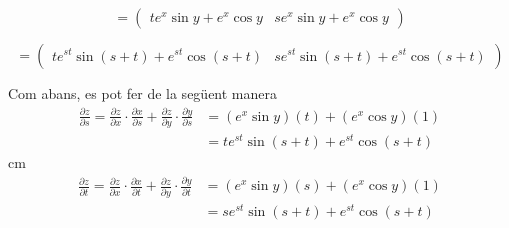 \documentclass[12pt]{article}
\begin{document}
\begin{equation*}
   =\left(\begin{array} {cc}
 t e^x \sin y + e^x
\cos y  & se^x \sin y +  e^x\cos y
\end{array} \right)
\end{equation*}

\begin{equation*}
   =\left(\begin{array} {cc}
 t e^{s t}\sin (s+ t) +  e^{s t} \cos (s+ t)  &
  s e^{s t}\sin (s+t) +  e^{s t} \cos (s+t)
\end{array} \right)
\end{equation*}

\vspace{0.4cm}
Com abans, es pot fer de la seg{\"u}ent manera
\begin{align*}
\frac{\partial z}{\partial s}=\frac{\partial z}{\partial x}
\cdot \frac{\partial x}{\partial s} + \frac{\partial z}{\partial
y} \cdot \frac{\partial y}{\partial s}  & = (e^x \sin y)(t) + (e^x
\cos y)(1) \\
& = t e^{s t}\sin (s+ t) +  e^{s t} \cos (s+ t)
\end{align*}
 cm
\vspace{0.4cm}\begin{align*}
\frac{\partial z}{\partial t}=\frac{\partial z}{\partial x}
\cdot \frac{\partial x}{\partial t} + \frac{\partial z}{\partial
y} \cdot \frac{\partial y}{\partial t} & = (e^x \sin y)(s) + (e^x
\cos y)(1) \\
& = s e^{s t}\sin (s+t) +  e^{s t} \cos (s+t)
\end{align*}
\end{document}
